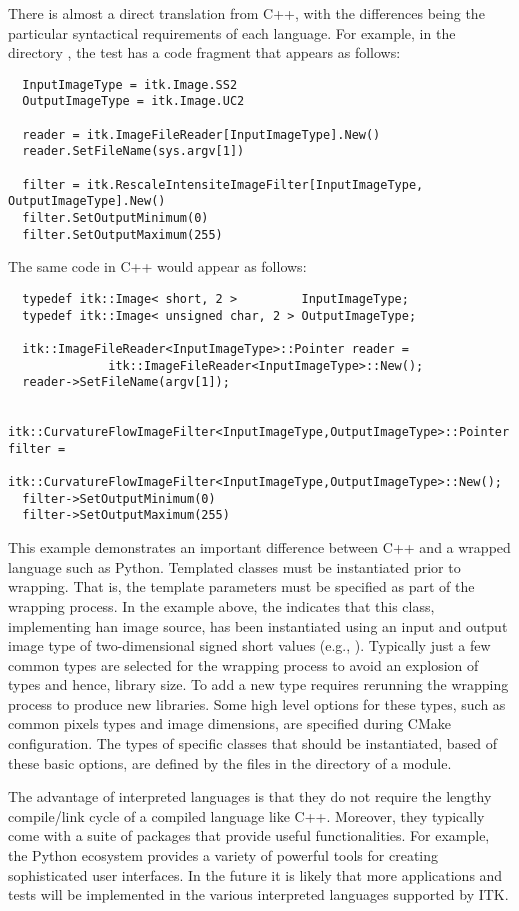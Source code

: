 There is almost a direct translation from C++, with the differences being the
particular syntactical requirements of each language. For example, in the
directory , the test  has a code
fragment that appears as follows:
\small
\begin{verbatim}
  InputImageType = itk.Image.SS2
  OutputImageType = itk.Image.UC2

  reader = itk.ImageFileReader[InputImageType].New()
  reader.SetFileName(sys.argv[1])

  filter = itk.RescaleIntensiteImageFilter[InputImageType, OutputImageType].New()
  filter.SetOutputMinimum(0)
  filter.SetOutputMaximum(255)
\end{verbatim}
\normalsize
The same code in C++ would appear as follows:

\small
\begin{verbatim}
  typedef itk::Image< short, 2 >         InputImageType;
  typedef itk::Image< unsigned char, 2 > OutputImageType;

  itk::ImageFileReader<InputImageType>::Pointer reader =
              itk::ImageFileReader<InputImageType>::New();
  reader->SetFileName(argv[1]);

  itk::CurvatureFlowImageFilter<InputImageType,OutputImageType>::Pointer filter =
      itk::CurvatureFlowImageFilter<InputImageType,OutputImageType>::New();
  filter->SetOutputMinimum(0)
  filter->SetOutputMaximum(255)
\end{verbatim}
\normalsize

This example demonstrates an important difference between C++ and a wrapped
language such as Python.  Templated classes must be instantiated prior to
wrapping. That is, the template parameters must be specified as part of the
wrapping process. In the example above, the
 indicates that this class, implementing
han image source, has been
instantiated using an input and output image type of two-dimensional signed
short values (e.g., ). Typically just a few common types are
selected for the wrapping process to avoid an explosion of types and hence,
library size. To add a new type requires rerunning the wrapping process to
produce new libraries.  Some high level options for these types, such as
common pixels types and image dimensions, are specified during CMake
configuration.  The types of specific classes that should be instantiated,
based of these basic options, are defined by the  files in the
 directory of a module.

The advantage of interpreted languages is that they do not require the lengthy
compile/link cycle of a compiled language like C++. Moreover, they typically
come with a suite of packages that provide useful functionalities. For example,
the Python ecosystem provides a variety of powerful tools for creating
sophisticated user interfaces. In the future it is likely that more
applications and tests will be implemented in the various interpreted
languages supported by ITK.
